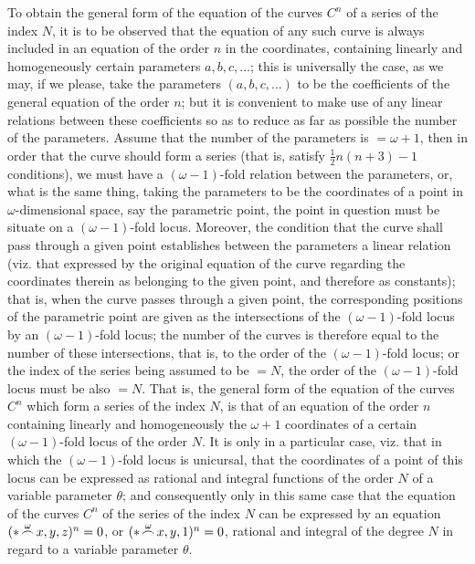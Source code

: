 \documentclass[12pt,a4paper]{article}
\begin{document}
To obtain the general form of the equation of the curves $C^n$ of a series of the index $N$, it is to be observed that the equation of any such curve is always included in an equation of the order $n$ in the coordinates, containing linearly and homogeneously certain parameters $a, b, c, \ldots$; this is universally the case, as we may, if we please, take the parameters $(a, b, c, \ldots)$ to be the coefficients of the general equation of the order $n$; but it is convenient to make use of any linear relations between these coefficients so as to reduce as far as possible the number of the parameters. Assume that the number of the parameters is $= \omega + 1$, then in order that the curve should form a series (that is, satisfy $\tfrac{1}{2}n(n+3) - 1$ conditions), we must have a $(\omega - 1)$-fold relation between the parameters, or, what is the same thing, taking the parameters to be the coordinates of a point in $\omega$-dimensional space, say the parametric point, the point in question must be situate on a $(\omega - 1)$-fold locus. Moreover, the condition that the curve shall pass through a given point establishes between the parameters a linear relation (viz. that expressed by the original equation of the curve regarding the coordinates therein as belonging to the given point, and therefore as constants); that is, when the curve passes through a given point, the corresponding positions of the parametric point are given as the intersections of the $(\omega - 1)$-fold locus by an $(\omega - 1)$-fold locus; the number of the curves is therefore equal to the number of these intersections, that is, to the order of the $(\omega - 1)$-fold locus; or the index of the series being assumed to be $= N$, the order of the $(\omega - 1)$-fold locus must be also $= N$. That is, the general form of the equation of the curves $C^n$ which form a series of the index $N$, is that of an equation of the order $n$ containing linearly and homogeneously the $\omega + 1$ coordinates of a certain $(\omega - 1)$-fold locus of the order $N$. It is only in a particular case, viz. that in which the $(\omega - 1)$-fold locus is unicursal, that the coordinates of a point of this locus can be expressed as rational and integral functions of the order $N$ of a variable parameter $\theta$; and consequently only in this same case that the equation of the curves $C^n$ of the series of the index $N$ can be expressed by an equation $(\ast\mskip-2mu\overset{\omega}{\frown}\mskip-2mu x, y, z)^n = 0$, or $(\ast\mskip-2mu\overset{\omega}{\frown}\mskip-2mu x, y, 1)^n = 0$, rational and integral of the degree $N$ in regard to a variable parameter $\theta$.
\end{document}
